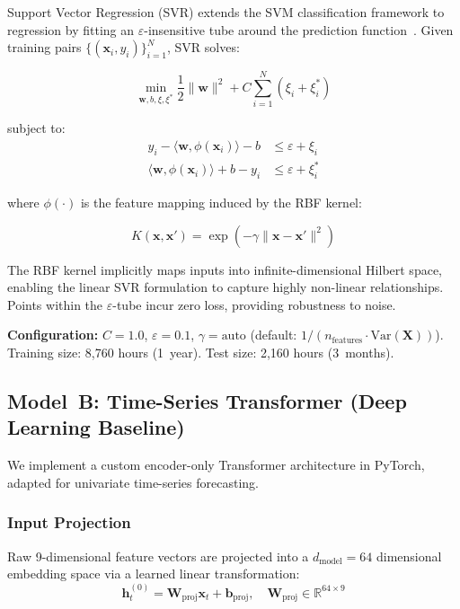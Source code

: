\documentclass[conference, 10pt]{IEEEtran}
\begin{document}
Support Vector Regression (SVR) extends the SVM classification framework to regression by fitting an $\varepsilon$-insensitive tube around the prediction function~\cite{vapnik1995support, smola2004tutorial}. Given training pairs $\{(\mathbf{x}_i, y_i)\}_{i=1}^{N}$, SVR solves:

\begin{equation}
\min_{\mathbf{w}, b, \xi, \xi^*} \frac{1}{2}\|\mathbf{w}\|^2 + C \sum_{i=1}^{N}(\xi_i + \xi_i^*)
\label{eq:svr}
\end{equation}

subject to:
\begin{align}
y_i - \langle \mathbf{w}, \phi(\mathbf{x}_i) \rangle - b &\leq \varepsilon + \xi_i \\
\langle \mathbf{w}, \phi(\mathbf{x}_i) \rangle + b - y_i &\leq \varepsilon + \xi_i^*
\end{align}

where $\phi(\cdot)$ is the feature mapping induced by the RBF kernel:

\begin{equation}
K(\mathbf{x}, \mathbf{x}') = \exp\!\left(-\gamma \|\mathbf{x} - \mathbf{x}'\|^2\right)
\label{eq:rbf}
\end{equation}

The RBF kernel implicitly maps inputs into infinite-dimensional Hilbert space, enabling the linear SVR formulation to capture highly non-linear relationships. Points within the $\varepsilon$-tube incur zero loss, providing robustness to noise.

\textbf{Configuration:} $C = 1.0$, $\varepsilon = 0.1$, $\gamma = \text{auto}$ (default: $1 / (n_\text{features} \cdot \text{Var}(\mathbf{X}))$). Training size: 8,760 hours (1~year). Test size: 2,160 hours (3~months).

\subsection{Model~B: Time-Series Transformer (Deep Learning Baseline)}

We implement a custom encoder-only Transformer architecture in PyTorch, adapted for univariate time-series forecasting.

\subsubsection{Input Projection}
Raw 9-dimensional feature vectors are projected into a $d_\text{model} = 64$ dimensional embedding space via a learned linear transformation:
\begin{equation}
\mathbf{h}_t^{(0)} = \mathbf{W}_\text{proj} \mathbf{x}_t + \mathbf{b}_\text{proj}, \quad \mathbf{W}_\text{proj} \in \mathbb{R}^{64 \times 9}
\end{equation}
\end{document}

